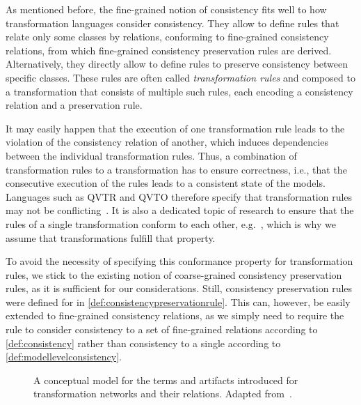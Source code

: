 As mentioned before, the fine-grained notion of consistency fits well to how transformation languages consider consistency.
They allow to define rules that relate only some classes by relations, conforming to fine-grained consistency relations, from which fine-grained consistency preservation rules are derived.
Alternatively, they directly allow to define rules to preserve consistency between specific classes.
These rules are often called \emph{transformation rules} and composed to a transformation that consists of multiple such rules, each encoding a consistency relation and a preservation rule.

It may easily happen that the execution of one transformation rule leads to the violation of the consistency relation of another, which induces dependencies between the individual transformation rules.
Thus, a combination of transformation rules to a transformation has to ensure correctness, i.e., that the consecutive execution of the rules leads to a consistent state of the models.
Languages such as \gls{QVTR} and \gls{QVTO} therefore specify that transformation rules may not be conflicting~\cite[7.10.2.]{qvt}.
It is also a dedicated topic of research to ensure that the rules of a single transformation conform to each other, e.g.~\cite{cuadrado2017tse,cabot2010VerificationInvariants-JSS}, which is why we assume that transformations fulfill that property.

To avoid the necessity of specifying this conformance property for transformation rules, we stick to the existing notion of coarse-grained consistency preservation rules, as it is sufficient for our considerations.
Still, consistency preservation rules were defined for \modellevelconsistencyrelations in \autoref{def:consistencypreservationrule}.
This can, however, be easily extended to fine-grained consistency relations, as we simply need to require the rule to consider consistency to a set of fine-grained relations according to \autoref{def:consistency} rather than consistency to a single \modellevelconsistencyrelation according to \autoref{def:modellevelconsistency}.

\begin{figure}
    \centering
    
    \caption[Conceptual model for transformation networks]{A conceptual model for the terms and artifacts introduced for transformation networks and their relations. Adapted from~.}
    \label{fig:correctness:conceptual_model}
\end{figure}

